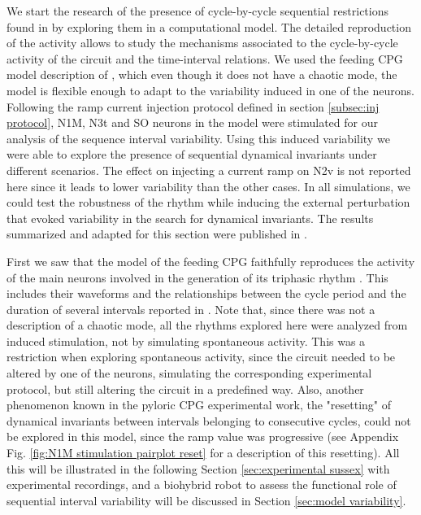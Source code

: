 We start the research of the presence of cycle-by-cycle sequential restrictions found in \textcite{elices_robust_2019} by exploring them in a computational model. The detailed reproduction of the activity allows to study the mechanisms associated to the cycle-by-cycle activity of the circuit and the time-interval relations. We used the feeding CPG model description of \textcite{vavoulis_dynamic_2007}, which even though it does not have a chaotic mode, the model is flexible enough to adapt to the variability induced in one of the neurons. Following the ramp current injection protocol defined in section \ref{subsec:inj protocol}, N1M, N3t and SO neurons in the model were stimulated for our analysis of the sequence interval variability. Using this induced variability we were able to explore the presence of sequential dynamical invariants under different scenarios. The effect on injecting a current ramp on N2v is not reported here since it leads to lower variability than the other cases. In all simulations, we could test the robustness of the rhythm while inducing the external perturbation that evoked variability in the search for dynamical invariants. The results summarized and adapted for this section were published in \cite{garrido-pena_characterization_2021}.

First we saw that the model of the feeding CPG faithfully reproduces the activity of the main neurons involved in the generation of its triphasic rhythm \parencite{vavoulis_dynamic_2007}. This includes their waveforms and the relationships between the cycle period and the duration of several intervals reported in \parencite{elliott_temporal_1991}. Note that, since there was not a description of a chaotic mode, all the rhythms explored here were analyzed from induced stimulation, not by simulating spontaneous activity. This was a restriction when exploring spontaneous activity, since the circuit needed to be altered by one of the neurons, simulating the corresponding experimental protocol, but still altering the circuit in a predefined way. Also, another phenomenon known in the pyloric CPG experimental work, the "resetting" of dynamical invariants between intervals belonging to consecutive cycles, could not be explored in this model, since the ramp value was progressive (see Appendix Fig. \ref{fig:N1M stimulation pairplot reset} for a description of this resetting). All this will be illustrated in the following Section \ref{sec:experimental sussex} with experimental recordings, and a biohybrid robot to assess the functional role of sequential interval variability will be discussed in Section \ref{sec:model variability}.

